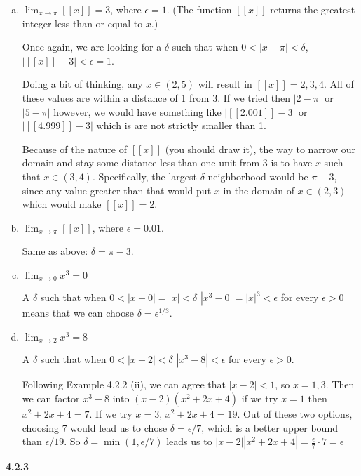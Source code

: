 \begin{enumerate}[(a)]
\item $\lim_{x\rightarrow \pi} [[x]] = 3$, where $\epsilon = 1$.
(The function $[[x]]$ returns the greatest integer less than or equal to $x$.)

Once again, we are looking for a $\delta$ such that when $0 < |x- \pi| < \delta$, $|[[x]] - 3| < \epsilon = 1$.

Doing a bit of thinking, any $x \in (2,5)$ will result in $[[x]] = 2, 3, 4$.
All of these values are within a distance of 1 from 3.
If we tried then $|2-\pi|$ or $|5-\pi|$ however, we would have something like $|[[2.001]]-3|$ or $|[[4.999]]-3|$
which is are not strictly smaller than 1.

Because of the nature of $[[x]]$ (you should draw it), the way to narrow our domain and stay some distance less than one unit
from $3$ is to have $x$ such that $x\in (3,4)$.
Specifically, the largest $\delta$-neighborhood would be $\pi - 3$, since any value greater than that would put $x$ in the domain of
$x\in (2,3)$ which would make $[[x]]=2$.

\item $\lim_{x\rightarrow \pi} [[x]]$, where $\epsilon = 0.01$.

Same as above: $\delta = \pi - 3$.

\item $\lim_{x\rightarrow 0} x^3 = 0$

A $\delta$ such that when $0 < |x-0| = |x| < \delta$ $|x^3 - 0| = |x|^3 < \epsilon$ for every $\epsilon > 0$
means that we can choose $\delta = \epsilon^{1/3}$.

\item $\lim_{x\rightarrow 2} x^3 = 8$

A $\delta$ such that when $0 < |x-2| < \delta$ $|x^3 - 8| < \epsilon$ for every $\epsilon > 0$.

Following Example 4.2.2 (ii), we can agree that $|x-2|<1$, so $x=1,3$.
Then we can factor $x^3 -8$ into $(x-2)(x^2 + 2x + 4)$ if we try $x=1$ then $x^2 + 2x + 4 = 7$.
If we try $x=3$, $x^2 + 2x + 4 = 19$.
Out of these two options, choosing 7 would lead us to chose $\delta = \epsilon /7$, which is a better upper bound than $\epsilon / 19$.
So $\delta = \min(1, \epsilon/7)$ leads us to $|x-2| |x^2 +2x + 4| = \frac{\epsilon}{7} \cdot 7 = \epsilon$

\end{enumerate}



\textbf{4.2.3}
\\

